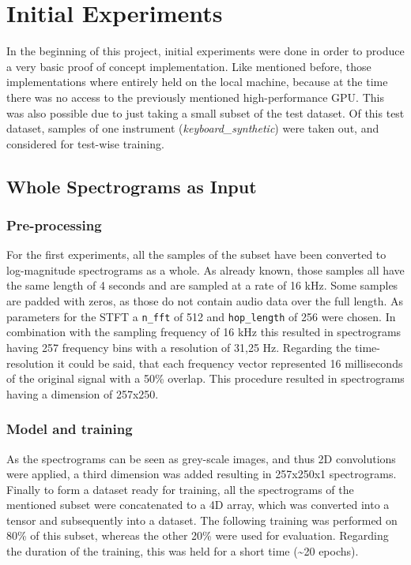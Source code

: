  
\section{Initial Experiments}
\label{sec:exp_init_experiment}
In the beginning of this project, initial experiments were done in order to produce a very basic proof of concept implementation. Like mentioned before, those implementations where entirely held on the local machine, because at the time there was no access to the previously mentioned high-performance GPU. This was also possible due to just taking a small subset of the test dataset. Of this test dataset, samples of one instrument (\textit{keyboard\_synthetic}) were taken out, and considered for test-wise training.

\subsection{Whole Spectrograms as Input}

\subsubsection{Pre-processing}
For the first experiments, all the samples of the subset have been converted to log-magnitude spectrograms as a whole. As already known, those samples all have the same length of 4 seconds and are sampled at a rate of 16 kHz. Some samples are padded with zeros, as those do not contain audio data over the full length. As parameters for the STFT a \texttt{n\_fft} of 512 and \texttt{hop\_length} of 256 were chosen. In combination with the sampling frequency of 16 kHz this resulted in spectrograms having 257 frequency bins with a resolution of 31,25 Hz. Regarding the time-resolution it could be said, that each frequency vector represented 16 milliseconds of the original signal with a 50\% overlap. This procedure resulted in spectrograms having a dimension of 257x250. 

\subsubsection{Model and training}
As the spectrograms can be seen as grey-scale images, and thus 2D convolutions were applied, a third dimension was added resulting in 257x250x1 spectrograms. Finally to form a dataset ready for training, all the spectrograms of the mentioned subset were concatenated to a 4D array, which was converted into a tensor and subsequently into a dataset. The following training was performed on 80\% of this subset, whereas the other 20\% were used for evaluation. Regarding the duration of the training, this was held for a short time (\textasciitilde20 epochs).

